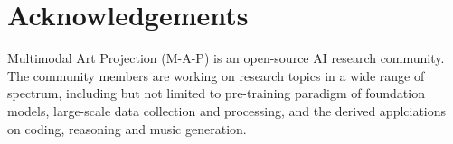 

\section{Acknowledgements}
Multimodal Art Projection (M-A-P) is an open-source AI research community.
The community members are working on research topics in a wide range of spectrum, including but not limited to pre-training paradigm of foundation models, large-scale data collection and processing, and the derived applciations on coding, reasoning and music generation.
